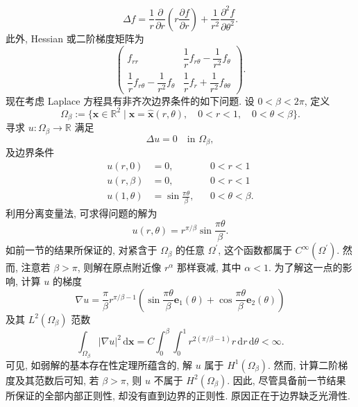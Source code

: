\begin{Example}
\begin{equation}\label{eq:corner-example-polar-laplacian-formula}
\Delta f=\frac{1}{r}\frac{\partial}{\partial r}\left(r\frac{\partial f}{\partial r}\right)+\frac{1}{r^2}\frac{\partial^2f}{\partial\theta^2}.
\end{equation}
此外, Hessian 或二阶梯度矩阵为
\begin{equation}\label{eq:corner-example-polar-hessian-matrix}
\begin{pmatrix}
f_{rr}&\dfrac{1}{r}f_{r\theta}-\dfrac{1}{r^2}f_\theta\\
\dfrac{1}{r}f_{r\theta}-\dfrac{1}{r^2}f_\theta&\dfrac{1}{r}f_r+\dfrac{1}{r^2}f_{\theta\theta}
\end{pmatrix}.
\end{equation}
现在考虑 Laplace 方程具有非齐次边界条件的如下问题. 设 $0<\beta<2\pi$, 定义
\begin{equation}\label{eq:corner-example-planar-sector-domain}
\Omega_\beta:=\{\bm{x}\in\mathbb{R}^2\mid\bm{x}=\widehat{\bm{x}}(r,\theta),\quad0<r<1,\quad0<\theta<\beta\}.
\end{equation}
寻求 $u:\Omega_\beta\to\mathbb{R}$ 满足
\begin{equation}\label{eq:corner-example-harmonic-sector-equation}
\Delta u=0\quad\text{in }\Omega_\beta,
\end{equation}
及边界条件\[\begin{aligned}
u(r,0)&=0,&&0<r<1\\
u(r,\beta)&=0,&&0<r<1\\
u(1,\theta)&=\sin\frac{\pi\theta}{\beta},&&0<\theta<\beta.
\end{aligned}\]利用分离变量法, 可求得问题的解为
\begin{equation}\label{eq:corner-example-explicit-harmonic-sector-solution}
u(r,\theta)=r^{\pi/\beta}\sin\frac{\pi\theta}{\beta}.
\end{equation}
如前一节的结果所保证的, 对紧含于 $\Omega_\beta$ 的任意 $\Omega^{\prime}$, 这个函数都属于 $C^\infty(\Omega^{\prime})$. 然而, 注意若 $\beta>\pi$, 则解在原点附近像 $r^\alpha$ 那样衰减, 其中 $\alpha<1$. 为了解这一点的影响, 计算 $u$ 的梯度
\begin{equation}\label{eq:corner-example-explicit-solution-gradient}
\nabla u=\frac{\pi}{\beta}r^{\pi/\beta-1}\left(\sin\frac{\pi\theta}{\beta}\bm{e}_1(\theta)+\cos\frac{\pi\theta}{\beta}\bm{e}_2(\theta)\right)
\end{equation}
及其 $L^2(\Omega_\beta)$ 范数
\begin{equation}\label{eq:corner-example-finite-gradient-l2-norm}
\int_{\Omega_\beta}|\nabla u|^2\,\mathrm{d}\bm{x}=C\int_0^\beta\int_0^1r^{2(\pi/\beta-1)}r\,\mathrm{d}r\,\mathrm{d}\theta<\infty.
\end{equation}
可见, 如弱解的基本存在性定理所蕴含的, 解 $u$ 属于 $H^1(\Omega_\beta)$. 然而, 计算二阶梯度及其范数后可知, 若 $\beta>\pi$, 则 $u$ 不属于 $H^2(\Omega_\beta)$. 因此, 尽管具备前一节结果所保证的全部内部正则性, 却没有直到边界的正则性. 原因正在于边界缺乏光滑性.
\end{Example}
